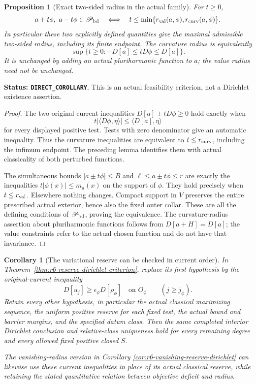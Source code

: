 \documentclass[11pt,a4paper]{article}
\numberwithin{equation}{section}
\newtheorem{proposition}[theorem]{Proposition}
\newtheorem{corollary}[theorem]{Corollary}
\theoremstyle{definition}
\theoremstyle{remark}
\begin{document}
\begin{proposition}[Exact two-sided radius in the actual family]
\label{prop:r6-exact-actual-variation-radius}
For $t\ge0$,
\[
 a+t\phi,\ a-t\phi\in\mathscr P_{\rm bd}
   \quad\Longleftrightarrow\quad
  t\le\min\{r_{\rm val}(a,\phi),r_{\rm curv}(a,\phi)\}.
\]
In particular these two explicitly defined quantities give the
maximal admissible two-sided radius, including its finite endpoint.
The curvature radius is equivalently
\[
 \sup\{t\ge0:-D[a]\le tD\phi\le D[a]\}.
\]
It is unchanged by adding an actual pluriharmonic function to $a$;
the value radius need not be unchanged.
\end{proposition}

\noindent\textbf{Status: \texttt{DIRECT\_COROLLARY}}. This is
an actual feasibility criterion, not a Dirichlet existence assertion.

\begin{proof}
The two original-current inequalities $D[a]\pm tD\phi\ge0$
hold exactly when
\[
 t|\langle D\phi,\eta\rangle|
                     \le\langle D[a],\eta\rangle
\]
for every displayed positive test. Tests with zero denominator
give an automatic inequality. Thus the curvature inequalities are
equivalent to $t\le r_{\rm curv}$, including the infimum endpoint.
The preceding lemma identifies them with actual classicality of
both perturbed functions.

The simultaneous bounds $|a\pm t\phi|\le B$ and
$\ell\le a\pm t\phi\le r$ are exactly the inequalities
$t|\phi(x)|\le m_a(x)$ on the support of $\phi$.
They hold precisely when $t\le r_{\rm val}$. Elsewhere nothing
changes. Compact support in $V$ preserves the entire prescribed
actual exterior, hence also the fixed outer collar. These are all
the defining conditions of $\mathscr P_{\rm bd}$, proving the
equivalence. The curvature-radius assertion about pluriharmonic
functions follows from $D[a+H]=D[a]$; the value constraints refer
to the actual chosen function and do not have that invariance.
\end{proof}

\begin{corollary}[The variational reserve can be checked in current order]
\label{cor:r6-distributional-reserve-upgrade}
In Theorem~\ref{thm:r6-reserve-dirichlet-criterion}, replace its
first hypothesis by the original-current inequality
\[
           D[u_j]\ge\epsilon_\phi D[\rho_\phi]
                        \quad\text{on }O_\phi
                        \qquad(j\ge j_\phi).
\]
Retain every other hypothesis, in particular the actual classical
maximizing sequence, the uniform positive reserve for each fixed
test, the actual bound and barrier margins, and the specified datum
class. Then the same completed interior Dirichlet conclusion and
relative-class uniqueness hold for every remaining degree and every
allowed fixed positive closed $S$.

The vanishing-radius version in Corollary
\ref{cor:r6-vanishing-reserve-dirichlet} can likewise use these current
inequalities in place of its actual classical reserve, while retaining
the stated quantitative relation between objective deficit and radius.
\end{corollary}
\end{document}
